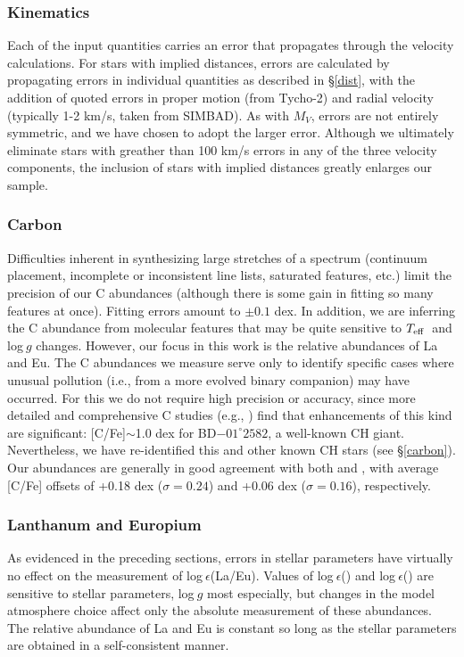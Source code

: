 \documentclass[12pt,preprint]{aastex}
\def\teff{\mbox{$T_{\rm {eff}}$}}
\begin{document}
{\subsubsection{Kinematics \label{kinerr}}
Each of the input quantities carries an error that propagates through the velocity calculations.  For stars with implied distances, errors are calculated by propagating errors in individual quantities as described in \S \ref{dist}, with the addition of quoted errors in proper motion (from Tycho-2) and radial velocity (typically 1-2 km/s, taken from SIMBAD).  As with $M_V$, errors are not entirely symmetric, and we have chosen to adopt the larger error.  Although we ultimately eliminate stars with greather than 100 km/s errors  in any of the three velocity components, the inclusion of stars with implied distances greatly enlarges our sample. 

\subsubsection{Carbon}
Difficulties inherent in synthesizing large stretches of a spectrum (continuum placement, incomplete or inconsistent line lists, saturated features, etc.) limit the precision of our C abundances (although there is some gain in fitting so many features at once).  Fitting errors amount to $\pm 0.1$ dex.  In addition, we are inferring the C abundance from molecular features that may be quite sensitive to \teff~and log$~g$ changes.  However, our focus in this work is the relative abundances of La and Eu.  The C abundances we measure serve only to identify specific cases where unusual pollution (i.e., from a more evolved binary companion) may have occurred.  For this we do not require high precision or accuracy, since more detailed and comprehensive C studies (e.g., \citealt{Kraft1982,Gratton2000}) find that enhancements of this kind are significant: [C/Fe]$\sim$1.0 dex for BD$-01^{\circ} 2582$, a well-known CH giant.  Nevertheless, we have re-identified this and other known CH stars (see \S \ref{carbon}). Our abundances are generally in good agreement with both \citet{Kraft1982} and \citet{Gratton2000}, with average [C/Fe] offsets of +0.18 dex ($\sigma=0.24$) and +0.06 dex ($\sigma=0.16$), respectively. 


\subsubsection{Lanthanum and Europium}
As evidenced in the preceding sections, errors in stellar parameters have virtually no effect on the measurement of log$~\epsilon$(La/Eu).  Values of log$~\epsilon$() and log$~\epsilon$() are sensitive to stellar parameters, log$~g$ most especially, but changes in the model atmosphere choice affect only the  absolute measurement of these abundances.  The relative abundance of La and Eu is constant so long as the stellar parameters are obtained in a self-consistent manner.     

}
\end{document}
